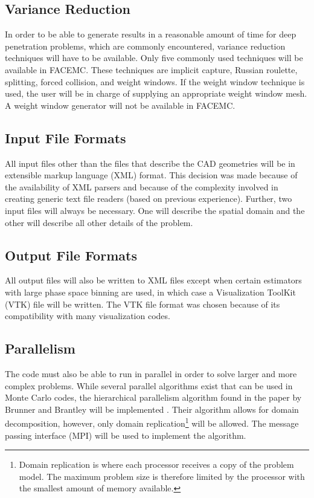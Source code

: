 \subsection{Variance Reduction}
In order to be able to generate results in a reasonable amount of time for
deep penetration problems, which are commonly encountered, variance reduction 
techniques will have to be available. Only five commonly used techniques will
be available in FACEMC. These techniques are implicit capture, Russian roulette,
splitting, forced collision, and weight windows. If the weight window technique
is used, the user will be in charge of supplying an appropriate weight window
mesh. A weight window generator will not be available in FACEMC.

\subsection{Input File Formats}
All input files other than the files that describe the CAD geometries will be
in extensible markup language (XML) format. This decision was made because of
the availability of XML parsers and because of the complexity involved in
creating generic text file readers (based on previous experience). Further,
two input files will always be necessary. One will describe the spatial domain 
and the other will describe all other details of the problem.

\subsection{Output File Formats}
All output files will also be written to XML files except when certain 
estimators with large phase space binning are used, in which case a 
Visualization ToolKit (VTK) file will be written. The VTK file format was 
chosen because of its compatibility with many visualization codes.

\subsection{Parallelism}
The code must also be able to run in parallel in order to solve larger and 
more complex problems. While several parallel algorithms exist that can be
used in Monte Carlo codes, the hierarchical parallelism algorithm found in
the paper by Brunner and Brantley will be implemented 
\citep{brunner_efficient_2009}. Their algorithm allows for domain decomposition,
however, only domain replication\footnote{Domain replication is where each 
processor receives a copy of the problem model. The maximum problem size is
therefore limited by the processor with the smallest amount of memory
available.} will be allowed. The message passing interface (MPI) will be used
to implement the algorithm.

